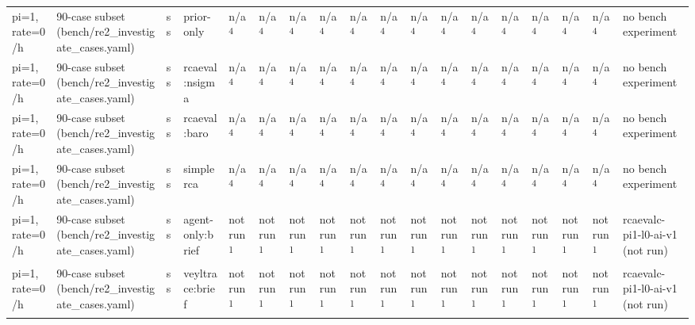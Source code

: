 \begin{table}[t]
\begin{tabular}{llllllllllllllllll}
pi=1, rate=0/h & 90-case subset (bench/re2\_investigate\_cases.yaml) & ss & prior-only & n/a\textsuperscript{4} & n/a\textsuperscript{4} & n/a\textsuperscript{4} & n/a\textsuperscript{4} & n/a\textsuperscript{4} & n/a\textsuperscript{4} & n/a\textsuperscript{4} & n/a\textsuperscript{4} & n/a\textsuperscript{4} & n/a\textsuperscript{4} & n/a\textsuperscript{4} & n/a\textsuperscript{4} & n/a\textsuperscript{4} & no bench experiment \\
pi=1, rate=0/h & 90-case subset (bench/re2\_investigate\_cases.yaml) & ss & rcaeval:nsigma & n/a\textsuperscript{4} & n/a\textsuperscript{4} & n/a\textsuperscript{4} & n/a\textsuperscript{4} & n/a\textsuperscript{4} & n/a\textsuperscript{4} & n/a\textsuperscript{4} & n/a\textsuperscript{4} & n/a\textsuperscript{4} & n/a\textsuperscript{4} & n/a\textsuperscript{4} & n/a\textsuperscript{4} & n/a\textsuperscript{4} & no bench experiment \\
pi=1, rate=0/h & 90-case subset (bench/re2\_investigate\_cases.yaml) & ss & rcaeval:baro & n/a\textsuperscript{4} & n/a\textsuperscript{4} & n/a\textsuperscript{4} & n/a\textsuperscript{4} & n/a\textsuperscript{4} & n/a\textsuperscript{4} & n/a\textsuperscript{4} & n/a\textsuperscript{4} & n/a\textsuperscript{4} & n/a\textsuperscript{4} & n/a\textsuperscript{4} & n/a\textsuperscript{4} & n/a\textsuperscript{4} & no bench experiment \\
pi=1, rate=0/h & 90-case subset (bench/re2\_investigate\_cases.yaml) & ss & simplerca & n/a\textsuperscript{4} & n/a\textsuperscript{4} & n/a\textsuperscript{4} & n/a\textsuperscript{4} & n/a\textsuperscript{4} & n/a\textsuperscript{4} & n/a\textsuperscript{4} & n/a\textsuperscript{4} & n/a\textsuperscript{4} & n/a\textsuperscript{4} & n/a\textsuperscript{4} & n/a\textsuperscript{4} & n/a\textsuperscript{4} & no bench experiment \\
pi=1, rate=0/h & 90-case subset (bench/re2\_investigate\_cases.yaml) & ss & agent-only:brief & not run\textsuperscript{1} & not run\textsuperscript{1} & not run\textsuperscript{1} & not run\textsuperscript{1} & not run\textsuperscript{1} & not run\textsuperscript{1} & not run\textsuperscript{1} & not run\textsuperscript{1} & not run\textsuperscript{1} & not run\textsuperscript{1} & not run\textsuperscript{1} & not run\textsuperscript{1} & not run\textsuperscript{1} & rcaevalc-pi1-l0-ai-v1 (not run) \\
pi=1, rate=0/h & 90-case subset (bench/re2\_investigate\_cases.yaml) & ss & veyltrace:brief & not run\textsuperscript{1} & not run\textsuperscript{1} & not run\textsuperscript{1} & not run\textsuperscript{1} & not run\textsuperscript{1} & not run\textsuperscript{1} & not run\textsuperscript{1} & not run\textsuperscript{1} & not run\textsuperscript{1} & not run\textsuperscript{1} & not run\textsuperscript{1} & not run\textsuperscript{1} & not run\textsuperscript{1} & rcaevalc-pi1-l0-ai-v1 (not run) \\

\end{tabular}
\end{table}
